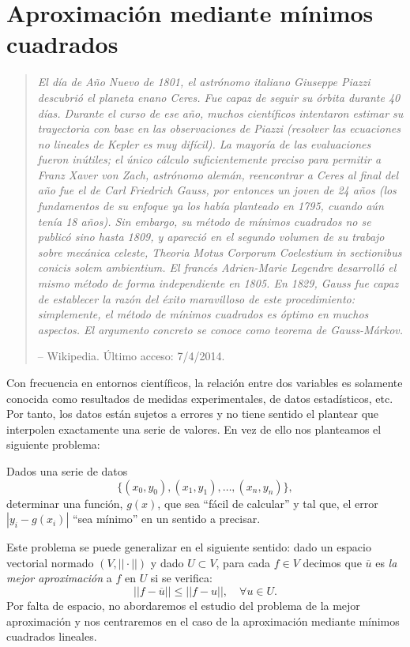 \section{Aproximación mediante mínimos cuadrados}
\label{sec:minimos-cuadrados}

\begin{quotation}
  \it\tiny El día de Año Nuevo de 1801, el astrónomo italiano Giuseppe
  Piazzi descubrió el planeta enano Ceres. Fue capaz de seguir su
  órbita durante 40 días. Durante el curso de ese año, muchos
  científicos intentaron estimar su trayectoria con base en las
  observaciones de Piazzi (resolver las ecuaciones no lineales de
  Kepler es muy difícil). La mayoría de las evaluaciones
  fueron inútiles; el único cálculo suficientemente preciso para
  permitir a Franz Xaver von Zach, astrónomo alemán, reencontrar a
  Ceres al final del año fue el de Carl Friedrich Gauss, por entonces
  un joven de 24 años (los fundamentos de su enfoque ya los había
  planteado en 1795, cuando aún tenía 18 años). Sin embargo, su método
  de mínimos cuadrados no se publicó sino hasta 1809, y apareció en el
  segundo volumen de su trabajo sobre mecánica celeste, Theoria Motus
  Corporum Coelestium in sectionibus conicis solem ambientium. El
  francés Adrien-Marie Legendre desarrolló el mismo método de forma
  independiente en 1805.  En 1829, Gauss fue capaz de establecer la
  razón del éxito maravilloso de este procedimiento: simplemente, el
  método de mínimos cuadrados es óptimo en muchos aspectos. El
  argumento concreto se conoce como teorema de Gauss-Márkov.
  \par\hfill
  -- Wikipedia. Último acceso: 7/4/2014.
\end{quotation}

Con frecuencia en entornos científicos, la relación entre dos
variables es solamente conocida como resultados de medidas
experimentales, de datos estadísticos, etc. Por tanto, los datos están
sujetos a errores y no tiene sentido el plantear que interpolen
exactamente una serie de valores. En vez de ello nos planteamos el
siguiente problema:

Dados una serie de datos
\begin{equation}
  \{(x_0,y_0),(x_1,y_1),\dots,(x_n,y_n)\},
  \label{eq:datos-min-cuadrados}
\end{equation}
determinar una función, $g(x)$, que sea ``fácil de calcular'' y tal
que, el error $|y_i-g(x_i)|$ ``sea mínimo'' en un sentido a precisar.

Este problema se puede generalizar en el siguiente sentido: dado un espacio
vectorial normado $(V,||\cdot||)$ y dado $U\subset V$, para cada $f\in
V$ decimos que $\overline u$ es \textit{la mejor aproximación} a $f$
en $U$ si se verifica:
\begin{equation*}
  ||f-\overline u|| \le ||f-u||, \quad \forall u\in U.
\end{equation*}
Por falta de espacio, no abordaremos el estudio del problema de la
mejor aproximación y nos centraremos en el caso de la
aproximación mediante mínimos cuadrados lineales.

